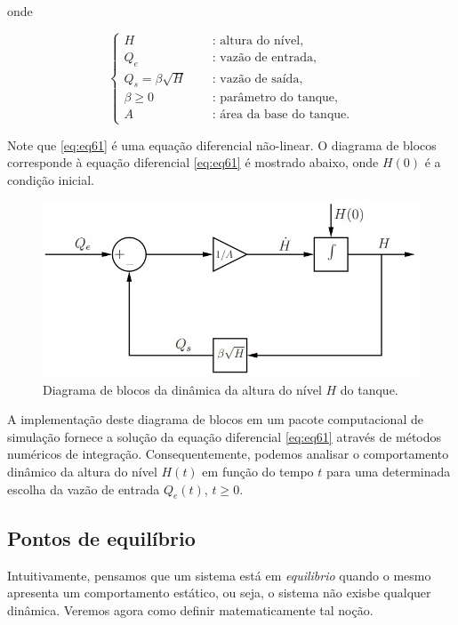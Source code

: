 \documentclass[
]{book}
\begin{document}
onde

\[
  \begin{cases}
    H & \quad \text{ : altura do nível,}\\
    Q_e & \quad \text{ : vazão de entrada,}\\
    Q_s = \beta\sqrt{H} & \quad \text{ : vazão de saída,}\\
    \beta \geq 0 & \quad \text{ : parâmetro do tanque,}\\
    A & \quad \text{ : área da base do tanque.}
  \end{cases}
\]

Note que \eqref{eq:eq61} é uma equação diferencial não-linear. O diagrama de blocos corresponde à equação diferencial \eqref{eq:eq61} é mostrado abaixo, onde \(H(0)\) é a condição inicial.

\begin{figure}

{\centering \includegraphics[width=0.5\linewidth]{Imagens/Lab6/Apresentação/fig2} 

}

\caption{Diagrama de blocos da dinâmica da altura do nível $H$ do tanque.}\label{fig:fig62}
\end{figure}

A implementação deste diagrama de blocos em um pacote computacional de simulação fornece a solução da equação diferencial \eqref{eq:eq61} através de métodos numéricos de integração. Consequentemente, podemos analisar o comportamento dinâmico da altura do nível \(H(t)\) em função do tempo \(t\) para uma determinada escolha da vazão de entrada \(Q_e(t)\), \(t\geq 0\).

\hypertarget{pontos-de-equiluxedbrio}{%
\subsection{Pontos de equilíbrio}\label{pontos-de-equiluxedbrio}}

Intuitivamente, pensamos que um sistema está em \emph{equilibrio} quando o mesmo apresenta um comportamento estático, ou seja, o sistema não exisbe qualquer dinâmica. Veremos agora como definir matematicamente tal noção.
\end{document}
